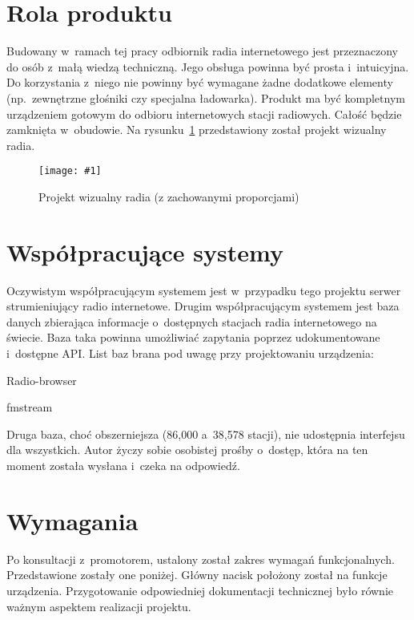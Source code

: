 \documentclass[polish]{aghengthesis}
\let\tempone\itemize
\let\temptwo\enditemize
\renewenvironment{itemize}{\tempone\setlength{\itemsep}{0cm}}{\temptwo}
\newcommand{\imgint}[4]{
	\begin{figure}[{#4}]
		\centering
		\texttt{[image: \#1]}
		\caption{#2}
		\label{#1}
	\end{figure}
}
\newcommand{\imgh}[3]{\imgint{#1}{#2}{#3}{H}}
\begin{document}
	\section{Rola produktu}
		Budowany w~ramach tej pracy odbiornik radia internetowego jest przeznaczony do osób z~małą wiedzą techniczną. Jego obsługa powinna być prosta i~intuicyjna. Do korzystania z~niego nie powinny być wymagane żadne dodatkowe elementy (np.~zewnętrzne głośniki czy specjalna ładowarka).
		Produkt ma być kompletnym urządzeniem gotowym do odbioru internetowych stacji radiowych. Całość będzie zamknięta w~obudowie. Na rysunku~\ref{1/radio_proj_trimmed} przedstawiony został projekt wizualny radia.
		
		\imgh{1/radio_proj_trimmed}{Projekt wizualny radia (z zachowanymi proporcjami)}{0.7}
		
	\section{Współpracujące systemy}
		Oczywistym współpracującym systemem jest w~przypadku tego projektu serwer strumieniujący radio internetowe.
		Drugim współpracującym systemem jest baza danych zbierająca informacje o~dostępnych stacjach radia internetowego na świecie. Baza taka powinna umożliwiać zapytania poprzez udokumentowane i~dostępne API. List baz brana pod uwagę przy projektowaniu urządzenia:
		\begin{itemize}
			\item Radio-browser\textsuperscript{\cite{radio-browser}}
			\item fmstream\textsuperscript{\cite{fmstream}}
		\end{itemize}
		
		Druga baza, choć obszerniejsza (86,000 a~38,578 stacji), nie udostępnia interfejsu dla wszystkich. Autor życzy sobie osobistej prośby o~dostęp, która na ten moment została wysłana i~czeka na odpowiedź.
		
	\section{Wymagania}
		Po konsultacji z~promotorem, ustalony został zakres wymagań funkcjonalnych. Przedstawione zostały one poniżej. Główny nacisk położony został na funkcje urządzenia.
		Przygotowanie odpowiedniej dokumentacji technicznej było równie ważnym aspektem realizacji projektu.
	
\end{document}
